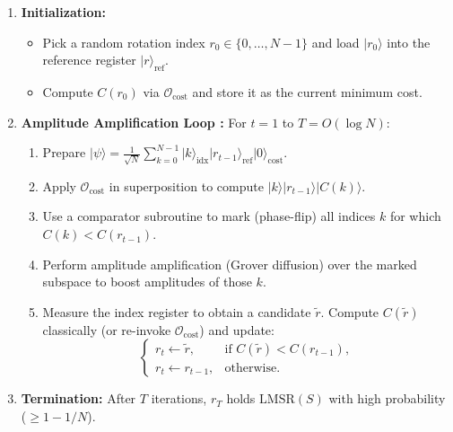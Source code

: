 \documentclass[11pt,letterpaper]{article}
\begin{document}
\begin{enumerate}
    \item \textbf{Initialization:}  
    \begin{itemize}
        \item Pick a random rotation index \(r_{0}\in\{0,\dots,N-1\}\) and load \(\lvert r_{0}\rangle\) into the reference register \(\lvert r\rangle_{\text{ref}}\).
        \item Compute \(C(r_{0})\) via \(\mathcal{O}_{\mathrm{cost}}\) and store it as the current minimum cost.
    \end{itemize}
    \item \textbf{Amplitude Amplification Loop \cite{brassard2002quantum}:} For \(t=1\) to \(T = O(\log N)\):
    \begin{enumerate}
        \item Prepare \(\lvert \psi\rangle = \tfrac{1}{\sqrt{N}} \sum_{k=0}^{N-1} \lvert k\rangle_{\text{idx}} \lvert r_{t-1}\rangle_{\text{ref}} \lvert 0\rangle_{\text{cost}}\).
        \item Apply \(\mathcal{O}_{\mathrm{cost}}\) in superposition to compute \(\lvert k\rangle\lvert r_{t-1}\rangle\lvert C(k)\rangle\).  
        \item Use a comparator subroutine to mark (phase-flip) all indices \(k\) for which \(C(k) < C(r_{t-1})\).  
        \item Perform amplitude amplification (Grover diffusion) over the marked subspace to boost amplitudes of those \(k\).  
        \item Measure the index register to obtain a candidate \(\tilde r\). Compute \(C(\tilde r)\) classically (or re-invoke \(\mathcal{O}_{\mathrm{cost}}\)) and update:
        \[
          \begin{cases}
            r_{t} \leftarrow \tilde r, & \text{if } C(\tilde r) < C(r_{t-1}),\\
            r_{t} \leftarrow r_{t-1}, & \text{otherwise.}
          \end{cases}
        \]
    \end{enumerate}
    \item \textbf{Termination:} After \(T\) iterations, \(r_{T}\) holds \(\mathrm{LMSR}(S)\) with high probability (\(\ge 1 - 1/N\)).  
\end{enumerate}
\end{document}
